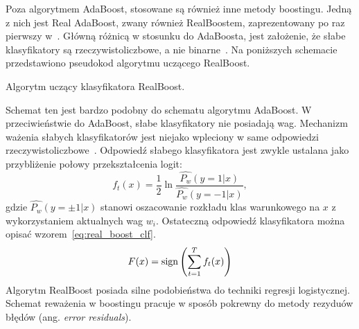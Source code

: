 Poza algorytmem AdaBoost, stosowane są również inne metody boostingu.
Jedną \linebreak z nich jest Real AdaBoost, zwany również RealBoostem, zaprezentowany po raz pierwszy w~\cite{10.1023/A:1007614523901}.
Główną różnicą w stosunku do AdaBoosta, jest założenie, że słabe klasyfikatory są rzeczywistoliczbowe, a nie binarne~\cite{szybka_detekcja_klesk}.
Na poniższych schemacie przedstawiono pseudokod algorytmu uczącego RealBoost.
\begin{algorithm}
    \caption{Algorytm uczący klasyfikatora RealBoost.}
\end{algorithm}
\FloatBarrier
Schemat ten jest bardzo podobny do schematu algorytmu AdaBoost.
W przeciwieństwie do AdaBoost, słabe klasyfikatory nie posiadają wag.
Mechanizm ważenia słabych klasyfikatorów jest niejako wpleciony w same odpowiedzi rzeczywistoliczbowe~\cite{szybka_detekcja_klesk}.
Odpowiedź słabego klasyfikatora jest zwykle ustalana jako przybliżenie połowy przekształcenia logit:
\begin{equation}
    \label{eq:real_boost}
    f_t(x) =\dfrac{1}{2}\ln\dfrac{\hat{P_w}(y=1|x)}{\hat{P_w}(y=-1|x)},
\end{equation}
gdzie $\hat{P_w}(y=\pm1|x)$ stanowi oszacowanie rozkładu klas warunkowego na $x$ z wykorzystaniem aktualnych wag $w_i$.
Ostateczną odpowiedź klasyfikatora można opisać wzorem~\eqref{eq:real_boost_clf}.
\begin{equation}
    \label{eq:real_boost_clf}
    F(x) = \operatorname{sign}\left(\sum_{t=1}^{T} f_t(x)\right)
\end{equation}
Algorytm RealBoost posiada silne podobieństwa do techniki regresji logistycznej.
Schemat reważenia w boostingu pracuje w sposób pokrewny do metody rezyduów błędów (ang. \textit{error residuals}).

